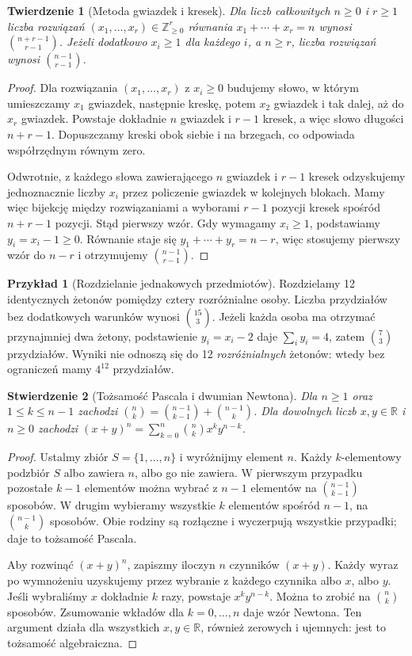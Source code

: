 \documentclass[11pt,a4paper,oneside]{report}
\numberwithin{equation}{chapter}
\theoremstyle{plain}
\newtheorem{twierdzenie}{Twierdzenie}[chapter]
\newtheorem{stwierdzenie}[twierdzenie]{Stwierdzenie}
\theoremstyle{definition}
\newtheorem{przyklad}{Przykład}[chapter]
\theoremstyle{remark}
\newcommand{\R}{\mathbb{R}}
\newcommand{\Z}{\mathbb{Z}}
\begin{document}
\begin{twierdzenie}[Metoda gwiazdek i kresek]
Dla liczb całkowitych $n\geq0$ i $r\geq1$ liczba rozwiązań
$(x_1,\ldots,x_r)\in\Z_{\geq0}^r$ równania $x_1+\cdots+x_r=n$ wynosi
$\binom{n+r-1}{r-1}$. Jeżeli dodatkowo $x_i\geq1$ dla każdego $i$,
a $n\geq r$, liczba rozwiązań wynosi $\binom{n-1}{r-1}$.
\end{twierdzenie}
\begin{proof}
Dla rozwiązania $(x_1,\ldots,x_r)$ z $x_i\geq0$
budujemy słowo, w którym umieszczamy $x_1$ gwiazdek,
następnie kreskę, potem $x_2$ gwiazdek i tak dalej,
aż do $x_r$ gwiazdek. Powstaje dokładnie $n$ gwiazdek
i $r-1$ kresek, a więc słowo długości $n+r-1$.
Dopuszczamy kreski obok siebie i na brzegach,
co odpowiada współrzędnym równym zero.

Odwrotnie, z każdego słowa zawierającego $n$ gwiazdek
i $r-1$ kresek odzyskujemy jednoznacznie liczby $x_i$
przez policzenie gwiazdek w kolejnych blokach.
Mamy więc bijekcję między rozwiązaniami a wyborami
$r-1$ pozycji kresek spośród $n+r-1$ pozycji.
Stąd pierwszy wzór. Gdy wymagamy $x_i\geq1$, podstawiamy
$y_i=x_i-1\geq0$. Równanie staje się
$y_1+\cdots+y_r=n-r$, więc stosujemy pierwszy wzór
do $n-r$ i otrzymujemy $\binom{n-1}{r-1}$.
\end{proof}

\begin{przyklad}[Rozdzielanie jednakowych przedmiotów]
Rozdzielamy 12 identycznych żetonów pomiędzy cztery rozróżnialne osoby.
Liczba przydziałów bez dodatkowych warunków wynosi $\binom{15}{3}$.
Jeżeli każda osoba ma otrzymać przynajmniej dwa żetony, podstawienie
$y_i=x_i-2$ daje $\sum_i y_i=4$, zatem $\binom73$ przydziałów.
Wyniki nie odnoszą się do 12 \emph{rozróżnialnych} żetonów:
wtedy bez ograniczeń mamy $4^{12}$ przydziałów.
\end{przyklad}

\begin{stwierdzenie}[Tożsamość Pascala i dwumian Newtona]
Dla $n\geq1$ oraz $1\leq k\leq n-1$ zachodzi
$\binom nk=\binom{n-1}{k-1}+\binom{n-1}k$. Dla dowolnych liczb
$x,y\in\R$ i $n\geq0$ zachodzi
$(x+y)^n=\sum_{k=0}^n\binom nk x^k y^{n-k}$.
\end{stwierdzenie}
\begin{proof}
Ustalmy zbiór $S=\{1,\ldots,n\}$ i wyróżnijmy element
$n$. Każdy $k$-elementowy podzbiór $S$ albo zawiera $n$,
albo go nie zawiera. W pierwszym przypadku pozostałe
$k-1$ elementów można wybrać z $n-1$ elementów na
$\binom{n-1}{k-1}$ sposobów. W drugim wybieramy wszystkie
$k$ elementów spośród $n-1$, na $\binom{n-1}{k}$
sposobów. Obie rodziny są rozłączne i wyczerpują wszystkie
przypadki; daje to tożsamość Pascala.

Aby rozwinąć $(x+y)^n$, zapiszmy iloczyn $n$ czynników
$(x+y)$. Każdy wyraz po wymnożeniu uzyskujemy przez
wybranie z każdego czynnika albo $x$, albo $y$.
Jeśli wybraliśmy $x$ dokładnie $k$ razy, powstaje
$x^ky^{n-k}$. Można to zrobić na $\binom nk$ sposobów.
Zsumowanie wkładów dla $k=0,\ldots,n$ daje wzór Newtona.
Ten argument działa dla wszystkich $x,y\in\R$, również
zerowych i ujemnych: jest to tożsamość algebraiczna.
\end{proof}
\end{document}
